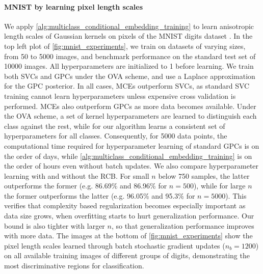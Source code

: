 \documentclass[twoside]{article}
\begin{document}
	\paragraph{MNIST by learning pixel length scales}
	
		We apply \cref{alg:multiclass_conditional_embedding_training} to learn anisotropic length scales of Gaussian kernels on pixels of the MNIST digits dataset \citep{lecun1998gradient}. In the top left plot of \cref{fig:mnist_experiments}, we train on datasets of varying sizes, from 50 to 5000 images, and benchmark performance on the standard test set of 10000 images. All hyperparameters are initialized to 1 before learning. We train both \glspl{SVC} and \glspl{GPC} under the \gls{OVA} scheme, and use a Laplace approximation for the \gls{GPC} posterior. In all cases, \glspl{MCE} outperform \glspl{SVC}, as standard \gls{SVC} training cannot learn hyperparameters unless expensive cross validation is performed. \glspl{MCE} also outperform \glspl{GPC} as more data becomes available. Under the \gls{OVA} scheme, a set of kernel hyperparameters are learned to distinguish each class against the rest, while for our algorithm learns a consistent set of hyperparameters for all classes. Consequently, for 5000 data points, the computational time required for hyperparameter learning of standard \glspl{GPC} is on the order of days, while \cref{alg:multiclass_conditional_embedding_training} is on the order of hours even without batch updates. We also compare hyperparameter learning with and without the \gls{RCB}. For small $n$ below 750 samples, the latter outperforms the former (e.g. 86.69\% and 86.96\% for $n = 500$), while for large $n$ the former outperforms the latter (e.g. 96.05\% and 95.3\% for $n= 5000$). This verifies that complexity based regularization becomes especially important as data size grows, when overfitting starts to hurt generalization performance. Our bound is also tighter with larger $n$, so that generalization performance improves with more data. The images at the bottom of \cref{fig:mnist_experiments} show the pixel length scales learned through batch stochastic gradient updates ($n_{b} = 1200$) on all available training images of different groups of digits, demonstrating the most discriminative regions for classification. %
	
\end{document}
